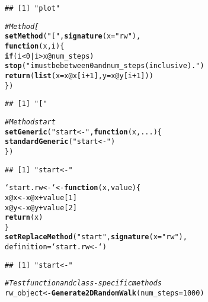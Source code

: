 \documentclass{article}\usepackage[]{graphicx}\usepackage[]{color}
\makeatletter
\newcommand{\hlnum}[1]{\textcolor[rgb]{0.686,0.059,0.569}{#1}}%
\newcommand{\hlstr}[1]{\textcolor[rgb]{0.192,0.494,0.8}{#1}}%
\newcommand{\hlcom}[1]{\textcolor[rgb]{0.678,0.584,0.686}{\textit{#1}}}%
\newcommand{\hlopt}[1]{\textcolor[rgb]{0,0,0}{#1}}%
\newcommand{\hlstd}[1]{\textcolor[rgb]{0.345,0.345,0.345}{#1}}%
\newcommand{\hlkwa}[1]{\textcolor[rgb]{0.161,0.373,0.58}{\textbf{#1}}}%
\newcommand{\hlkwb}[1]{\textcolor[rgb]{0.69,0.353,0.396}{#1}}%
\newcommand{\hlkwc}[1]{\textcolor[rgb]{0.333,0.667,0.333}{#1}}%
\newcommand{\hlkwd}[1]{\textcolor[rgb]{0.737,0.353,0.396}{\textbf{#1}}}%
\newenvironment{kframe}{%
 \def\at@end@of@kframe{}%
 \ifinner\ifhmode%
  \def\at@end@of@kframe{\end{minipage}}%
  \begin{minipage}{\columnwidth}%
 \fi\fi%
 \def\FrameCommand##1{\hskip\@totalleftmargin \hskip-\fboxsep
 \colorbox{shadecolor}{##1}\hskip-\fboxsep
     \hskip-\linewidth \hskip-\@totalleftmargin \hskip\columnwidth}%
 \MakeFramed {\advance\hsize-\width
   \@totalleftmargin\z@ \linewidth\hsize
   \@setminipage}}%
 {\par\unskip\endMakeFramed%
 \at@end@of@kframe}
\newenvironment{knitrout}{}{} %
\makeatother
\begin{document}
\begin{knitrout}
\begin{kframe}
{\ttfamily\noindent\itshape\color{messagecolor}{\#\# Creating a generic function for 'plot' from package 'graphics' in the global environment}}\begin{verbatim}
## [1] "plot"
\end{verbatim}
\begin{alltt}
 \hlcom{# Method [}
\hlkwd{setMethod}\hlstd{(}\hlstr{"["}\hlstd{,} \hlkwd{signature}\hlstd{(}\hlkwc{x} \hlstd{=} \hlstr{"rw"}\hlstd{),}
          \hlkwa{function}\hlstd{(}\hlkwc{x}\hlstd{,} \hlkwc{i}\hlstd{) \{}
            \hlkwa{if} \hlstd{(i} \hlopt{<} \hlnum{0} \hlopt{|} \hlstd{i} \hlopt{>} \hlstd{x}\hlopt{@}\hlkwc{num_steps}\hlstd{)}
              \hlkwd{stop}\hlstd{(}\hlstr{"i must be between 0 and num_steps (inclusive)."}\hlstd{)}
            \hlkwd{return}\hlstd{(}\hlkwd{list}\hlstd{(}\hlkwc{x} \hlstd{= x}\hlopt{@}\hlkwc{x}\hlstd{[i}\hlopt{+}\hlnum{1}\hlstd{],} \hlkwc{y} \hlstd{= x}\hlopt{@}\hlkwc{y}\hlstd{[i}\hlopt{+}\hlnum{1}\hlstd{]))}
          \hlstd{\})}
\end{alltt}
\begin{verbatim}
## [1] "["
\end{verbatim}
\begin{alltt}
 \hlcom{# Method start}
\hlkwd{setGeneric}\hlstd{(}\hlstr{"start<-"}\hlstd{,} \hlkwa{function}\hlstd{(}\hlkwc{x}\hlstd{,} \hlkwc{...}\hlstd{) \{}
  \hlkwd{standardGeneric}\hlstd{(}\hlstr{"start<-"}\hlstd{)}
\hlstd{\})}
\end{alltt}
\begin{verbatim}
## [1] "start<-"
\end{verbatim}
\begin{alltt}
\hlstd{`start.rw<-`} \hlkwb{<-} \hlkwa{function}\hlstd{(}\hlkwc{x}\hlstd{,} \hlkwc{value}\hlstd{) \{}
  \hlstd{x}\hlopt{@}\hlkwc{x} \hlkwb{<-} \hlstd{x}\hlopt{@}\hlkwc{x} \hlopt{+} \hlstd{value[}\hlnum{1}\hlstd{]}
  \hlstd{x}\hlopt{@}\hlkwc{y} \hlkwb{<-} \hlstd{x}\hlopt{@}\hlkwc{y} \hlopt{+} \hlstd{value[}\hlnum{2}\hlstd{]}
  \hlkwd{return}\hlstd{(x)}
\hlstd{\}}
\hlkwd{setReplaceMethod}\hlstd{(}\hlstr{"start"}\hlstd{,} \hlkwd{signature}\hlstd{(}\hlkwc{x} \hlstd{=} \hlstr{"rw"}\hlstd{),}
                 \hlkwc{definition} \hlstd{= `start.rw<-`)}
\end{alltt}
\begin{verbatim}
## [1] "start<-"
\end{verbatim}
\begin{alltt}
 \hlcom{# Test function and class-specific methods}
 \hlstd{rw_object} \hlkwb{<-} \hlkwd{Generate2DRandomWalk}\hlstd{(}\hlkwc{num_steps} \hlstd{=} \hlnum{1000}\hlstd{)}

\end{alltt}
\end{kframe}
\end{knitrout}
\end{document}
